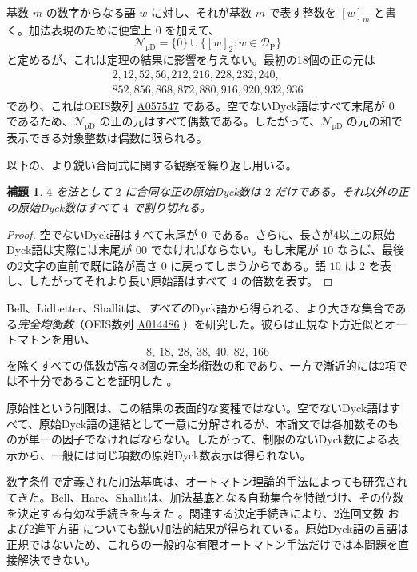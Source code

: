 \documentclass[12pt]{ltjsarticle}
\theoremstyle{plain}
\newtheorem{lemma}[theorem]{補題}
\theoremstyle{definition}
\theoremstyle{plain}
\newcommand{\val}[2]{[#1]_{#2}}
\newcommand{\NpD}{\mathcal{N}_{\mathrm{pD}}}
\newcommand{\DP}{\mathcal{D}_{\mathrm{P}}}
\newcommand{\seqnum}[1]{\href{https://oeis.org/#1}{\textrm{\underline{#1}}}}
\begin{document}
基数 $m$ の数字からなる語 $w$ に対し、それが基数 $m$ で表す整数を $\val{w}{m}$ と書く。加法表現のために便宜上 $0$ を加えて、
\[
 \NpD=\{0\}\cup\{\val{w}{2}:w\in\DP\}
\]
と定めるが、これは定理の結果に影響を与えない。最初の18個の正の元は
\[
\begin{gathered}
2,12,52,56,212,216,228,232,240,\\
852,856,868,872,880,916,920,932,936
\end{gathered}
\]
であり、これはOEIS数列 \seqnum{A057547} \cite{OEIS-A057547} である。空でないDyck語はすべて末尾が $0$ であるため、$\NpD$ の正の元はすべて偶数である。したがって、$\NpD$ の元の和で表示できる対象整数は偶数に限られる。

以下の、より鋭い合同式に関する観察を繰り返し用いる。

\begin{lemma}\label{lem:mod4}
$4$ を法として $2$ に合同な正の原始Dyck数は $2$ だけである。それ以外の正の原始Dyck数はすべて $4$ で割り切れる。
\end{lemma}

\begin{proof}
空でないDyck語はすべて末尾が $0$ である。さらに、長さが4以上の原始Dyck語は実際には末尾が $00$ でなければならない。もし末尾が $10$ ならば、最後の2文字の直前で既に路が高さ $0$ に戻ってしまうからである。語 $10$ は $2$ を表し、したがってそれより長い原始語はすべて $4$ の倍数を表す。
\end{proof}

Bell、Lidbetter、Shallitは、\emph{すべての}Dyck語から得られる、より大きな集合である\emph{完全均衡数}（OEIS数列 \seqnum{A014486} \cite{OEIS-A014486}）を研究した。彼らは正規な下方近似とオートマトンを用い、
\[
        8,\ 18,\ 28,\ 38,\ 40,\ 82,\ 166
\]
を除くすべての偶数が高々3個の完全均衡数の和であり、一方で漸近的には2項では不十分であることを証明した \cite[Thm.\ 14]{BLS}。

原始性という制限は、この結果の表面的な変種ではない。空でないDyck語はすべて、原始Dyck語の連結として一意に分解されるが、本論文では各加数そのものが単一の因子でなければならない。したがって、制限のないDyck数による表示から、一般には同じ項数の原始Dyck数表示は得られない。

数字条件で定義された加法基底は、オートマトン理論的手法によっても研究されてきた。Bell、Hare、Shallitは、加法基底となる自動集合を特徴づけ、その位数を決定する有効な手続きを与えた \cite{BHS}。関連する決定手続きにより、2進回文数 \cite{RSS} および2進平方語 \cite{MNRS} についても鋭い加法的結果が得られている。原始Dyck語の言語は正規ではないため、これらの一般的な有限オートマトン手法だけでは本問題を直接解決できない。
\end{document}
